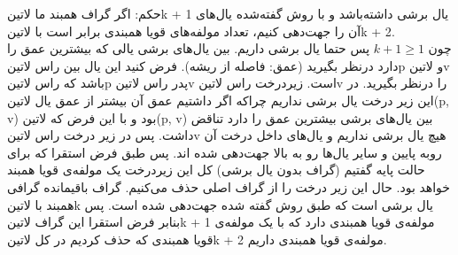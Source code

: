 {حکم: اگر گراف همبند ما ‌لاتین{k + 1} یال برشی داشته‌باشد و با روش گفته‌شده یال‌های آن را جهت‌دهی کنیم، تعداد مولفه‌های قویا همبندی برابر است با ‌لاتین{k + 2}.\\
چون 
$k + 1 \ge 1$
پس حتما یال برشی داریم. بین یال‌های برشی یالی که بیشترین عمق را دارد درنظر بگیرید (عمق: فاصله از ریشه). فرض کنید این یال بین راس ‌لاتین{p} و ‌لاتین{v} باشد که راس ‌لاتین{p} پدر راس ‌لاتین{v} است. زیردرخت راس ‌لاتین{v} را درنظر بگیرید. در این زیر درخت یال برشی نداریم چراکه اگر داشتیم عمق آن بیشتر از عمق یال ‌لاتین{(p, v)} بود و با این فرض که ‌لاتین{(p, v)} بین یال‌های برشی بیشترین عمق را دارد تناقض داشت. پس در زیر درخت راس ‌لاتین{v} هیچ یال برشی نداریم و یال‌های داخل درخت آن روبه پایین و سایر یال‌ها رو به بالا جهت‌دهی شده اند. پس طبق فرض استقرا که برای حالت پایه گفتیم (گراف بدون یال برشی) کل این زیردرخت یک مولفه‌ی قویا همبند خواهد بود. حال این زیر درخت را از گراف اصلی حذف می‌کنیم. گراف باقیمانده گرافی همبند با ‌لاتین{k} یال برشی است که طبق روش گفته شده جهت‌دهی شده است. پس بنابر فرض استقرا این گراف ‌لاتین{k + 1} مولفه‌ی قویا همبندی دارد که با یک مولفه‌ی قویا همبندی که حذف کردیم در کل ‌لاتین{k + 2} مولفه‌ی قویا همبندی داریم. 


}











